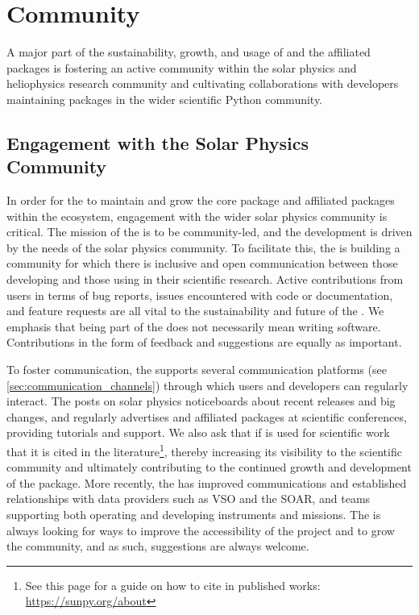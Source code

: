 \section{Community}
\label{section:community}

A major part of the sustainability, growth, and usage of \sunpypkg and the affiliated packages is fostering an active community within the solar physics and heliophysics research community and cultivating collaborations with developers maintaining packages in the wider scientific Python community. 

\subsection{Engagement with the Solar Physics Community}
\label{sec:communication}

In order for the \sunpyproj to maintain and grow the \sunpypkg core package and affiliated packages within the ecosystem, engagement with the wider solar physics community is critical. 
The mission of the \sunpyproj is to be community-led, and the development is driven by the needs of the solar physics community. 
To facilitate this, the \sunpyproj is building a community for which there is inclusive and open communication between those developing \sunpypkg and those using \sunpypkg in their scientific research. 
Active contributions from users in terms of bug reports, issues encountered with code or documentation, and feature requests are all vital to the sustainability and future of the \sunpyproj.
We emphasis that being part of the \sunpyproj does not necessarily mean writing software. Contributions in the form of feedback and suggestions are equally as important. 

To foster communication, the \sunpyproj supports several communication platforms (see \autoref{sec:communication_channels}) through which users and developers can regularly interact. 
The \sunpyproj posts on solar physics noticeboards about recent releases and big changes, and regularly advertises \sunpypkg and affiliated packages at scientific conferences, providing tutorials and support. 
We also ask that if \sunpypkg is used for scientific work that it is cited in the literature\footnote{See this page for a guide on how to cite \sunpypkg in published works: \url{https://sunpy.org/about}}, thereby increasing its visibility to the scientific community and ultimately contributing to the continued growth and development of the package.
More recently, the \sunpyproj has improved communications and established relationships with data providers such as VSO and the SOAR, and teams supporting both operating and developing instruments and missions. 
The \sunpyproj is always looking for ways to improve the accessibility of the project and to grow the community, and as such, suggestions are always welcome. 

